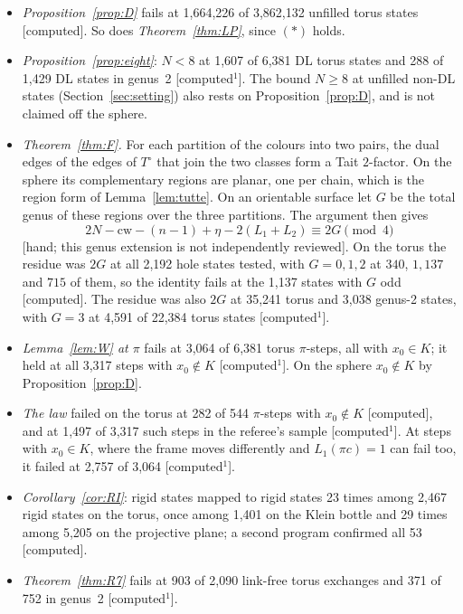 \documentclass[11pt]{article}
\theoremstyle{definition}
\newcommand{\lab}[1]{\textsf{[#1]}}
\newcommand{\labone}{\textsf{[computed$^1$]}}
\newcommand{\cw}{\mathrm{cw}}
\begin{document}
\begin{itemize}
\item \emph{Proposition~\ref{prop:D}} fails at 1,664,226 of 3,862,132 unfilled torus states \lab{computed}. So does \emph{Theorem~\ref{thm:LP}}, since $(\ast)$ holds.
\item \emph{Proposition~\ref{prop:eight}}: $N<8$ at 1,607 of 6,381 DL torus states and 288 of 1,429 DL states in genus~2 \labone. The bound $N\ge8$ at unfilled non-DL states (Section~\ref{sec:setting}) also rests on Proposition~\ref{prop:D}, and is not claimed off the sphere.
\item \emph{Theorem~\ref{thm:F}.} For each partition of the colours into two pairs, the dual edges of the edges of $T^\circ$ that join the two classes form a Tait $2$-factor. On the sphere its complementary regions are planar, one per chain, which is the region form of Lemma~\ref{lem:tutte}. On an orientable surface let $G$ be the total genus of these regions over the three partitions. The argument then gives
\[2N-\cw-(n-1)+\eta-2(L_1+L_2)\equiv 2G\pmod 4\]
\lab{hand; this genus extension is not independently reviewed}. On the torus the residue was $2G$ at all 2,192 hole states tested, with $G=0,1,2$ at $340$, $1{,}137$ and $715$ of them, so the identity fails at the 1,137 states with $G$ odd \lab{computed}. The residue was also $2G$ at 35,241 torus and 3,038 genus-2 states, with $G=3$ at 4,591 of 22,384 torus states \labone.
\item \emph{Lemma~\ref{lem:W} at $\pi$} fails at 3,064 of 6,381 torus $\pi$-steps, all with $x_0\in K$; it held at all 3,317 steps with $x_0\notin K$ \labone. On the sphere $x_0\notin K$ by Proposition~\ref{prop:D}.
\item \emph{The law} failed on the torus at 282 of 544 $\pi$-steps with $x_0\notin K$ \lab{computed}, and at 1,497 of 3,317 such steps in the referee's sample \labone. At steps with $x_0\in K$, where the frame moves differently and $L_1(\pi c)=1$ can fail too, it failed at 2,757 of 3,064 \labone.
\item \emph{Corollary~\ref{cor:RI}}: rigid states mapped to rigid states 23 times among 2,467 rigid states on the torus, once among 1,401 on the Klein bottle and 29 times among 5,205 on the projective plane; a second program confirmed all 53 \lab{computed}.
\item \emph{Theorem~\ref{thm:R7}} fails at 903 of 2,090 link-free torus exchanges and 371 of 752 in genus~2 \labone.
\end{itemize}
\end{document}
